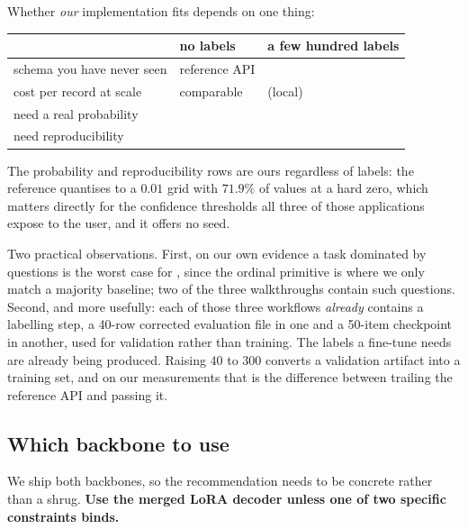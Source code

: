 Whether \emph{our} implementation fits depends on one thing:

\begin{center}
\begin{tabular}{lll}
\toprule
 & no labels & a few hundred labels \\
\midrule
schema you have never seen & reference API & \openjev{} \\
cost per record at scale & comparable & \openjev{} (local) \\
need a real probability & \openjev{} & \openjev{} \\
need reproducibility & \openjev{} & \openjev{} \\
\bottomrule
\end{tabular}
\end{center}

The probability and reproducibility rows are ours regardless of labels:
the reference quantises to a $0.01$ grid with $71.9\%$ of values at a hard
zero, which matters directly for the confidence thresholds all three of
those applications expose to the user, and it offers no seed.

Two practical observations. First, on our own evidence a task dominated by
\score{} questions is the worst case for \openjev{}, since the ordinal
primitive is where we only match a majority baseline; two of the three
walkthroughs contain such questions. Second, and more usefully: each of
those three workflows \emph{already} contains a labelling step, a
40-row corrected evaluation file in one and a 50-item checkpoint in
another, used for validation rather than training. The labels a
fine-tune needs are already being produced. Raising 40 to 300 converts a
validation artifact into a training set, and on our measurements that is
the difference between trailing the reference API and passing it.

\subsection{Which backbone to use}
\label{sec:when-backbone}

We ship both backbones, so the recommendation needs to be concrete rather
than a shrug. \textbf{Use the merged LoRA decoder unless one of two
specific constraints binds.}

